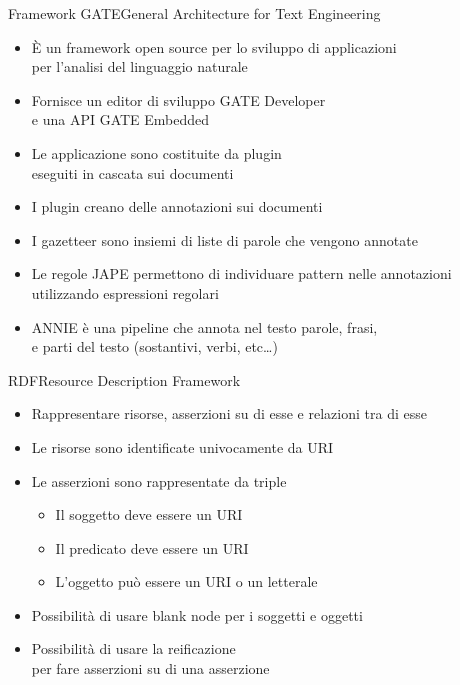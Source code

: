 \documentclass[dvips, 11pt]{beamer}
\begin{document}
\begin{frame}{Framework GATE}{General Architecture for Text Engineering}
  \begin{itemize}
  \item \`E un framework open source per lo sviluppo di applicazioni\\
    per l'analisi del linguaggio naturale
    \pause
  \item Fornisce un editor di sviluppo \alert{GATE Developer}\\
    e una API \alert{GATE Embedded}
    \pause
  \item Le applicazione sono costituite da \alert{plugin}\\
    eseguiti in cascata sui documenti
    \pause
  \item I plugin creano delle \alert{annotazioni} sui documenti
    \pause
  \item I \alert{gazetteer} sono insiemi di liste di parole che vengono annotate
    \pause
  \item Le regole \alert{JAPE} permettono di individuare pattern nelle annotazioni\\
    utilizzando espressioni regolari
    \pause
  \item \alert{ANNIE} \`e una pipeline che annota nel testo parole, frasi,\\
    e parti del testo (sostantivi, verbi, etc\dots)
  \end{itemize}
\end{frame}

\begin{frame}{RDF}{Resource Description Framework}
  \begin{itemize}
  \item Rappresentare \alert{risorse}, \alert{asserzioni} su di esse e relazioni tra di esse
    \pause
  \item Le risorse sono identificate univocamente da \alert{URI}
    \pause
  \item Le asserzioni sono rappresentate da \alert{triple}
    \pause
    \begin{itemize}
    \item Il \alert{soggetto} deve essere un URI
      \pause
    \item Il \alert{predicato} deve essere un URI
      \pause
    \item L'\alert{oggetto} pu\`o essere un URI o un letterale
      \pause
    \end{itemize}
  \item Possibilit\`a di usare \alert{blank node} per i soggetti e oggetti
    \pause
  \item Possibilit\`a di usare la \alert{reificazione}\\
    per fare asserzioni su di una asserzione
  \end{itemize}
\end{frame}
\end{document}
